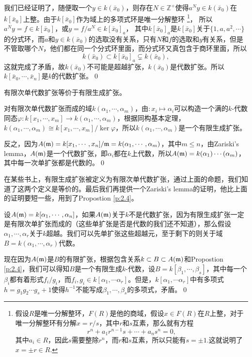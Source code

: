 	我们已经证明了，随便取一个$y\in k(\bar{x}_0)$，则存在$N\in \mathbb{Z}^+$使得$a^Ny\in k(\bar{x}_0)$在$k[\bar{x}_0]$上整。由于$k[\bar{x}_0]$作为域上的多项式环是唯一分解整环
	\footnote{假设$R$是唯一分解整环，$F(R)$是他的商域，假设$x\in F(R)$在$R$上整，对于唯一分解整环有分解$x=r/s$，其中$r$和$s$互素，那么就有方程
	\[
		r^n+a_1r^{n-1}s+\cdots+a_n s^n=0,
	\]
	其中$a_i\in R$，因此$s$需要整除$r^n$，而$r$和$s$互素，所以只能有$s=\pm 1$.这就说明了$x=\pm r\in R$.}，
	所以$a^Ny=f\in k[\bar{x}_0]$，或$y=f/a^N\in k[\bar{x}_0]_{a}$，
	其中$k[\bar{x}_0]_{a}$是$k[\bar{x}_0]$关于$\{1,a,a^2,\cdots\}$的分式环，而$a$和$y\in  k(\bar{x}_0)$的选取没有关系，只有$N$和$f$的选取和$y$有关系，但是不管取哪个$N$，他们都在同一个分式环里面，而分式环又真包含于商环里面，所以
	\[
		k(\bar{x}_0)\subset k[\bar{x}_0]_{a}\subsetneq k(\bar{x}_0),
	\]
	这就完成了矛盾，故$k(\bar{x}_0)$不可能是超越扩张，$k(\bar{x}_0)$是代数扩张。所以$k[\bar{x}_0,\cdots,\bar{x}_{n}]$是$k$的代数扩张。\qed

\pro  有限次单代数扩张等价于有限生成扩张。

\proof 对有限次单代数扩张而成的域$k(\alpha_1,\cdots,\alpha_m)$，由$:x_i\mapsto \alpha_i$可以构造一个满的$k$-代数同态$\varphi:k[x_1,\cdots,x_m]\to k(\alpha_1,\cdots,\alpha_m)$，根据同构基本定理，$k(\alpha_1,\cdots,\alpha_m)\cong k[x_1,\cdots,x_m]/\ker \varphi$，所以$k(\alpha_1,\cdots,\alpha_m)$是一个有限生成扩张。

反之，因为$A(\mathfrak{m})=k[x_1,\cdots,x_n]/\mathfrak{m}=k(\alpha_1,\cdots,\alpha_m)$，其中$m\leq n$，由Zariski's lemma，$A(\mathfrak{m})$是一个代数扩张，即$\alpha_i$都在$k$上代数，所以$A(\mathfrak{m})=k(\alpha_1)\cdots(\alpha_m)$，其中每一次单扩张都是代数的。\qed

在某些书上，有限生成扩张被定义为有限次单代数扩张，通过上面的命题，我们知道了这两个定义是等价的。最后我们再提供一个Zariski's lemma的证明，他比上面的证明要短一些，用到了Propostion \ref{p:2.4}。

\proof 设$A(\mathfrak{m})=k[\alpha_1,\cdots,\alpha_n]$，如果$A(\mathfrak{m})$关于$k$不是代数扩张，因为有限生成扩张一定是有限次单扩张而成的（这些单扩张是否是代数的我们还不知道），那么假设$\alpha_1,\cdots ,\alpha_r$关于$k$超越。我们可以先单扩张这些超越元，至于剩下的则关于域$B=k(\alpha_1,\cdots ,\alpha_r)$代数。

现在因为$A(\mathfrak{m})$是$B$的有限扩张，根据包含关系$k\subset B\subset A(\mathfrak{m})$和Propostion \ref{p:2.4}，我们可以得知$B$是一个有限生成$k$-代数，设$B=k[\beta_1,\cdots ,\beta_s]$，其中每一个$\beta_i$都有着形式$f_i/g_i$，而$f_i,g_i\in k[\alpha_1,\cdots \alpha_r]$。但是，$k[\alpha_1,\cdots \alpha_r]$中有多项式$h=g_1g_2\cdots g_{s}+1$使得$h^{-1}$不能写成$\beta_1,\cdots ,\beta_s$的多项式，矛盾。\qed

